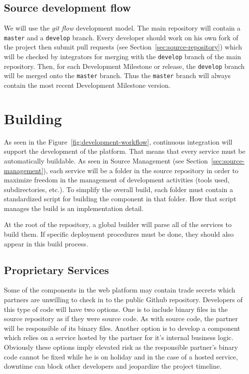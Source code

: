 \subsection{Source development flow}
\label{sec:source-development-flow}

We will use the \emph{git flow}\cite{kreeftmeijer:2010} development model. The main repository will
contain a \texttt{master} and a \texttt{develop} branch. Every developer should work on his
own fork of the project then submit pull requests (see Section~\ref{sec:source-repository})
which will be checked by integrators for merging with the \texttt{develop} branch of the main
repository. Then, for each Development Milestone or release, the \texttt{develop} branch will
be merged onto the \texttt{master} branch. Thus the \texttt{master} branch will always contain
the most recent Development Milestone version.

\section{Building}
\label{sec:building}

As seen in the Figure~\ref{fig:development-workflow}, continuous integration will support the
development of the platform. That means that every service must be automatically buildable.
As seen in Source Management (see Section~\ref{sec:source-management}), each service will be a
folder in the source repository in order to maximize freedom in the management of development
activities (tools used, subdirectories, etc.). To simplify the overall build, each folder must
contain a standardized script for building the component in that folder. How that script manages
the build is an implementation detail.

At the root of the repository, a global builder will parse all of the services to build them.
If specific deployment procedures must be done, they should also appear in this build process.

\subsection{Proprietary Services}
\label{sec:proprietary-services}

Some of the components in the \learnpad web platform may contain trade secrets which partners
are unwilling to check in to the public Github repository. Developers of this type of
code will have two options. One is to include binary files in the source
repository as if they were source code. As with source code, the partner will be responsible of
its binary files. Another option is to
develop a component which relies on a service hosted by the partner for it's internal business
logic. Obviously these options imply elevated risk as the responsible partner's binary code
cannot be fixed while he is on holiday and in the case of a hosted service, downtime can block
other developers and jeopardize the project timeline.

